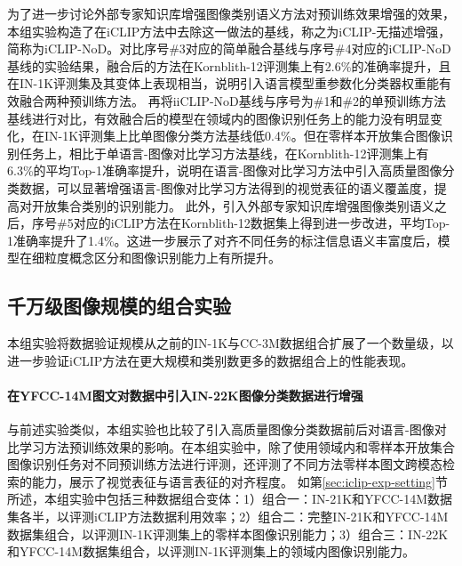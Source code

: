 为了进一步讨论外部专家知识库增强图像类别语义方法对预训练效果增强的效果，本组实验构造了在iCLIP方法中去除这一做法的基线，称之为iCLIP-无描述增强，简称为iCLIP-NoD。对比序号\#3对应的简单融合基线与序号\#4对应的iCLIP-NoD基线的实验结果，融合后的方法在Kornblith-12评测集上有2.6\%的准确率提升，且在IN-1K评测集及其变体上表现相当，说明引入语言模型重参数化分类器权重能有效融合两种预训练方法。
再将iiCLIP-NoD基线与序号为\#1和\#2的单预训练方法基线进行对比，有效融合后的模型在领域内的图像识别任务上的能力没有明显变化，在IN-1K评测集上比单图像分类方法基线低0.4\%。但在零样本开放集合图像识别任务上，相比于单语言-图像对比学习方法基线，在Kornblith-12评测集上有6.3\%的平均Top-1准确率提升，说明在语言-图像对比学习方法中引入高质量图像分类数据，可以显著增强语言-图像对比学习方法得到的视觉表征的语义覆盖度，提高对开放集合类别的识别能力。
此外，引入外部专家知识库增强图像类别语义之后，序号\#5对应的iCLIP方法在Kornblith-12数据集上得到进一步改进，平均Top-1准确率提升了1.4\%。这进一步展示了对齐不同任务的标注信息语义丰富度后，模型在细粒度概念区分和图像识别能力上有所提升。


\subsection{千万级图像规模的组合实验}
本组实验将数据验证规模从之前的IN-1K与CC-3M数据组合扩展了一个数量级，以进一步验证iCLIP方法在更大规模和类别数更多的数据组合上的性能表现。

\paragraph{在YFCC-14M图文对数据中引入IN-22K图像分类数据进行增强} 与前述实验类似，本组实验也比较了引入高质量图像分类数据前后对语言-图像对比学习方法预训练效果的影响。在本组实验中，除了使用领域内和零样本开放集合图像识别任务对不同预训练方法进行评测，还评测了不同方法零样本图文跨模态检索的能力，展示了视觉表征与语言表征的对齐程度。
如第\ref{sec:iclip-exp-setting}节所述，本组实验中包括三种数据组合变体：1）组合一：IN-21K和YFCC-14M数据集各半，以评测iCLIP方法数据利用效率；2）组合二：完整IN-21K和YFCC-14M数据集组合，以评测IN-1K评测集上的零样本图像识别能力；3）组合三：IN-22K和YFCC-14M数据集组合，以评测IN-1K评测集上的领域内图像识别能力。

